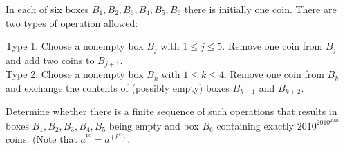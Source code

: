 \begin{tcolorbox}[enhanced, breakable, rounded corners,
    colback=red!5!white, colframe=red!75!black,
    colbacktitle=red!85!black, fonttitle=\bfseries, coltitle=white, title=IMO 2010 Problem 5 (Boxes)]

\setlength{\parskip}{1em}
In each of six boxes $B_{1}, B_{2}, B_{3}, B_{4}, B_{5}, B_{6}$ there is initially one coin. There are two types of operation allowed:

Type 1: Choose a nonempty box $B_{j}$ with $1 \leq j \leq 5$. Remove one coin from $B_{j}$ and add two coins to $B_{j+1}$.\\
Type 2: Choose a nonempty box $B_{k}$ with $1 \leq k \leq 4$. Remove one coin from $B_{k}$ and exchange the contents of (possibly empty) boxes $B_{k+1}$ and $B_{k+2}$.

Determine whether there is a finite sequence of such operations that results in boxes $B_{1}, B_{2}, B_{3}, B_{4}, B_{5}$ being empty and box $B_{6}$ containing exactly $2010^{2010^{2010}}$ coins. (Note that $a^{b^{c}}=a^{\left(b^{c}\right)}$.
\end{tcolorbox}